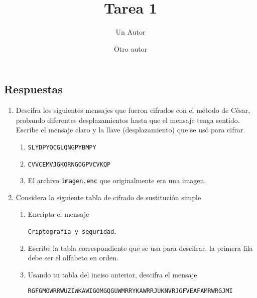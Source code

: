 \documentclass[11pt]{article} %
\title{Tarea 1}
\author{Un Autor \and Otro autor}
\date{}
\begin{document}
	\maketitle

	\subsection*{Respuestas}
	\begin{enumerate}
		\item Descifra los siguientes mensajes que fueron cifrados con el método de César, probando diferentes desplazamientos hasta que el mensaje tenga sentido. Escribe el mensaje claro y la llave (desplazamiento) que se usó para cifrar.
		\begin{enumerate}
			\item \texttt{SLYDPYQCGLQNGPYBMPY}
			\item \texttt{CVVCEMVJGKORNGOGPVCVKQP}
			\item El archivo \texttt{imagen.enc} que originalmente era una imagen.
		\end{enumerate}

		\item Considera la siguiente tabla de cifrado de sustitución simple
		\begin{table}[ht]
			\centering
		\end{table}
		\begin{enumerate}
			\item Encripta el mensaje
			\begin{center}
				\texttt{Criptografia y seguridad}.
			\end{center}
			\item Escribe la tabla correspondiente que se usa para descifrar, la primera fila debe ser el alfabeto en orden.
			\item Usando tu tabla del inciso anterior, descifra el mensaje
			\begin{center}
				\texttt{RGFGMOWRRWUZIWKAWIGOMGQGUWMRRYKAWRRJUKNVRJGFVEAFAMRWRGJMI}
			\end{center}
			

\end{enumerate}
\end{enumerate}
\end{document}
